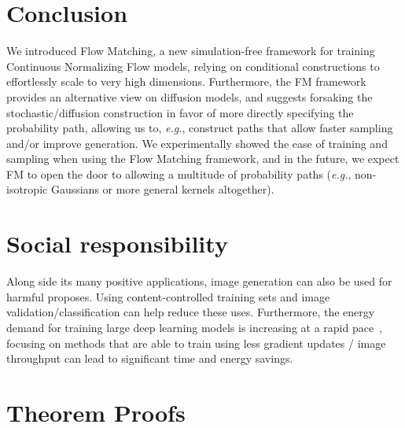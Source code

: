 \documentclass{article}
\makeatletter
\renewcommand*{\eg}{{\it e.g.}\@\xspace}
\makeatother
\begin{document}
\section{Conclusion}\vspace{-3pt}
We introduced Flow Matching, a new simulation-free framework for training Continuous Normalizing Flow models, relying on conditional constructions to effortlessly scale to very high dimensions.
Furthermore, the FM framework provides an alternative view on diffusion models, and suggests forsaking the stochastic/diffusion construction in favor of more directly specifying the probability path, allowing us to, \eg, construct paths that allow faster sampling and/or improve generation.
We experimentally showed the ease of training and sampling when using the Flow Matching framework, and in the future, we expect FM to open the door to allowing a multitude of probability paths (\eg, non-isotropic Gaussians or more general kernels altogether). 

\newpage

\section{Social responsibility}
Along side its many positive applications, image generation can also be used for harmful proposes. Using content-controlled training sets and image validation/classification can help reduce these uses. Furthermore, the energy demand for training large deep learning models is increasing at a rapid pace~\citep{openaiandcompute,thompson2020computational}, focusing on methods that are able to train using less gradient updates / image throughput can lead to significant time and energy savings. 






\newpage 
\appendix

\section{Theorem Proofs}
\label{A:proofs}
\end{document}
